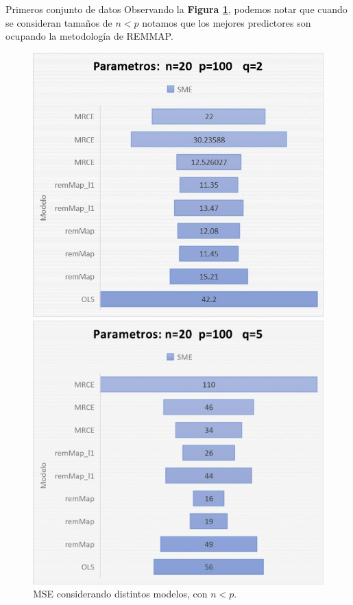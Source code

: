 \begin{frame}{Primeros conjunto de datos}
    Observando la \textbf{Figura \ref{MSE_1}}, podemos notar que cuando se consideran tamaños de $n<p$ notamos que los mejores predictores son ocupando la metodología de REMMAP.
     \begin{figure}[!htb]
   \includegraphics[scale=.4]{figure/im1.jpg}
  \caption{}
 \endminipage
   \includegraphics[scale=.4]{figure/im2.jpg}
  \caption{}
 \endminipage
 \caption{MSE considerando distintos modelos, con $n<p.$}\label{MSE_1}
 \end{figure}
\end{frame}

